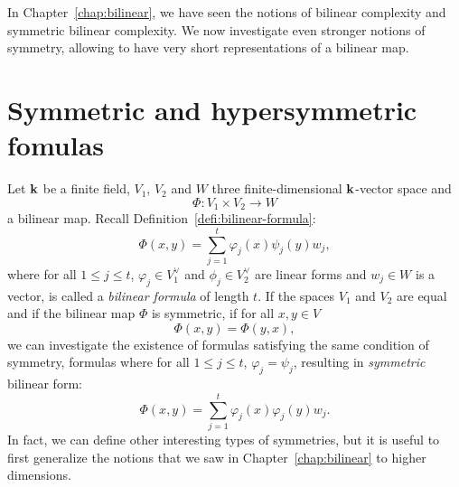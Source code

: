 In Chapter~\ref{chap:bilinear}, we have seen the notions of bilinear complexity
and symmetric bilinear complexity. We now investigate even stronger
notions of symmetry, allowing to have very short representations of a bilinear
map.

\minitoc

%
%
%

\clearpage
\section{Symmetric and hypersymmetric fomulas}
%
%
%

Let $\mathbf{k}$ be a finite field, $V_1$, $V_2$ and $W$ three finite-dimensional $\mathbf{k}$-vector
space and
\[
  \Phi:V_1\times V_2\to W
\]
a bilinear map. Recall Definition~\ref{defi:bilinear-formula}:
\[
  \Phi(x, y) = \sum_{j=1}^t\varphi_j(x)\psi_j(y)w_j,
\]
where for all $1\leq j\leq t$, $\varphi_j\in V_1^\vee$ and $\phi_j\in V_2^\vee$ are linear forms and
$w_j\in W$ is a vector, is called a \emph{bilinear formula} of length $t$. If
the spaces $V_1$ and $V_2$ are equal and if the bilinear map $\Phi$ is
symmetric, \ie if for all $x, y\in V$
\[
  \Phi(x, y) = \Phi(y, x),
\]
we can investigate the existence of formulas satisfying the same condition of
symmetry, \ie formulas where for all $1\leq j\leq t$, $\varphi_j=\psi_j$,
resulting in \emph{symmetric} bilinear form:
\[
  \Phi(x, y) = \sum_{j=1}^t\varphi_j(x)\varphi_j(y)w_j.
\]
In fact, we can define other interesting types of symmetries, but it is useful
to first generalize the notions that we saw in Chapter~\ref{chap:bilinear} to
higher dimensions.
